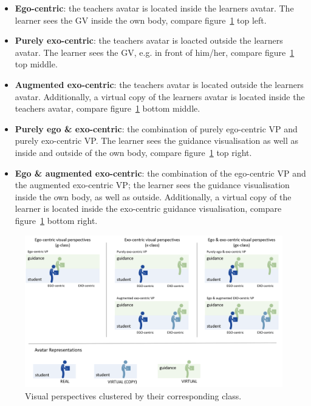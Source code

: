 \begin{itemize}
	\item \textbf{Ego-centric}: the teachers avatar is located inside the learners avatar. The learner sees the GV inside the own body, compare figure~\ref{fig:perspectives} top left.
	\item \textbf{Purely exo-centric}: the teachers avatar is loacted outside the learners avatar. The learner sees the GV, e.g. in front of him/her, compare figure~\ref{fig:perspectives} top middle.
	\item \textbf{Augmented exo-centric}: the teachers avatar is located outside the learners avatar. Additionally, a virtual copy of the learners avatar is located inside the teachers avatar, compare figure~\ref{fig:perspectives} bottom middle.
	\item \textbf{Purely ego \& exo-centric}: the combination of purely ego-centric VP and purely exo-centric VP. The learner sees the guidance visualisation as well as inside and outside of the own body, compare figure~\ref{fig:perspectives} top right.
	\item \textbf{Ego \& augmented exo-centric}: the combination of the ego-centric VP and the augmented exo-centric VP; the learner sees the guidance visualisation inside the own body, as well as outside. Additionally, a virtual copy of the learner is located inside the exo-centric guidance visualisation, compare figure~\ref{fig:perspectives} bottom right.	
\end{itemize}
\begin{figure}[htb]
	\centering
	\includegraphics[width=\textwidth]{figures/perspectives_new.png}
	\caption[Visual perspectives]{Visual perspectives clustered by their corresponding class.}
	\label{fig:perspectives}
\end{figure}

